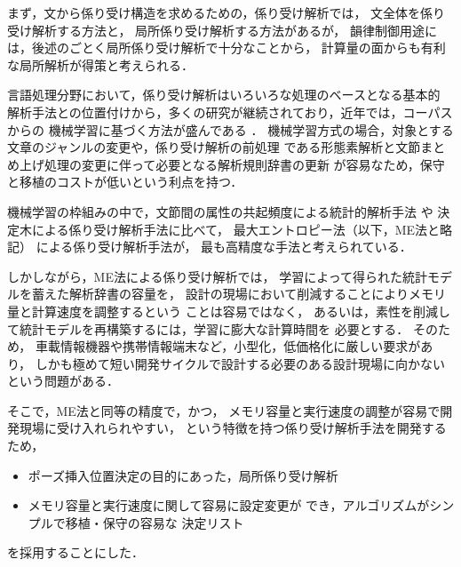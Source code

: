 まず，文から係り受け構造を求めるための，係り受け解析では，
文全体を係り受け解析する方法\cite{佐藤1999}と，
局所係り受け解析する方法\cite{鈴木1995}があるが，
韻律制御用途には，後述のごとく局所係り受け解析で十分なことから，
計算量の面からも有利な局所解析が得策と考えられる．

言語処理分野において，係り受け解析はいろいろな処理のベースとなる基本的
解析手法との位置付けから，多くの研究が継続されており，近年では，コーパスからの
機械学習に基づく方法が盛んである
\cite{藤尾1997,白井1998,春野1998,江原1998,内元1999}．
機械学習方式の場合，対象とする文章のジャンルの変更や，係り受け解析の前処理
である形態素解析と文節まとめ上げ処理の変更に伴って必要となる解析規則辞書の更新
が容易なため，保守と移植のコストが低いという利点を持つ．

機械学習の枠組みの中で，文節間の属性の共起頻度による統計的解析手法
\cite{藤尾1997}や
決定木による係り受け解析手法\cite{春野1998}に比べて，
最大エントロピー法（以下，ME法と略記）
による係り受け解析手法\cite{江原1998,内元1999}が，
最も高精度な手法と考えられている．

しかしながら，ME法による係り受け解析では，
学習によって得られた統計モデルを蓄えた解析辞書の容量を，
設計の現場において削減することによりメモリ量と計算速度を調整するという
ことは容易ではなく，
あるいは，素性を削減して統計モデルを再構築するには，学習に膨大な計算時間を
必要とする\cite{内元1999}．
そのため，
車載情報機器や携帯情報端末など，小型化，低価格化に厳しい要求があり，
しかも極めて短い開発サイクルで設計する必要のある設計現場に向かない
という問題がある．

そこで，ME法と同等の精度で，かつ，
メモリ容量と実行速度の調整が容易で開発現場に受け入れられやすい，
という特徴を持つ係り受け解析手法を開発するため，

\begin{itemize}
  \item 
	ポーズ挿入位置決定の目的にあった，局所係り受け解析
 \item
	メモリ容量と実行速度に関して容易に設定変更が
	でき，アルゴリズムがシンプルで移植・保守の容易な
	決定リスト \cite{Yarowsky1994}
\end{itemize}
を採用することにした．


